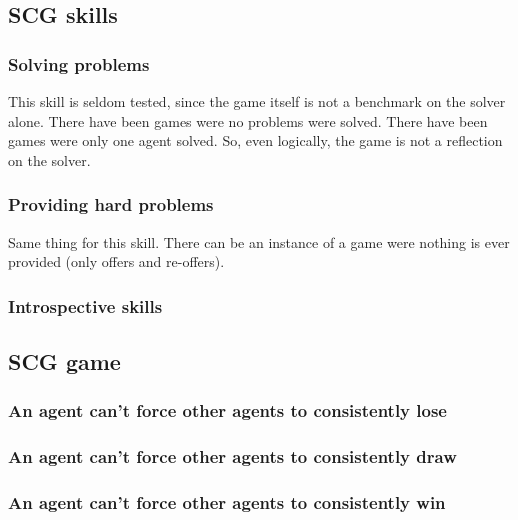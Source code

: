 \documentclass[letterpaper,12pt,oneside]{article}
\begin{document}
\subsection{SCG skills}

\subsubsection{Solving problems}

This skill is seldom tested, since the game itself is not a benchmark on
the solver alone. There have been games were no problems were solved. There
have been games were only one agent solved. So, even logically, the game is
not a reflection on the solver.

\subsubsection{Providing hard problems}

Same thing for this skill. There can be an instance of a game were nothing
is ever provided (only offers and re-offers).

\subsubsection{Introspective skills}


\subsection{SCG game}

\subsubsection{An agent can't force other agents to consistently lose}
\subsubsection{An agent can't force other agents to consistently draw}
\subsubsection{An agent can't force other agents to consistently win}

% 
% 
\end{document}

